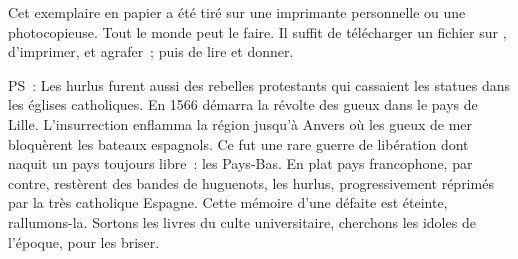 \documentclass[french,twoside]{book} %
\newif\ifdev
\renewcommand{\LettrineFontHook}{\color{rubric}}
\newcommand{\initialiv}[2]{%
  \let\oldLFH\LettrineFontHook
  \IfSubStr{QJ’}{#1}{
    \lettrine[lines=4, lhang=0.2, loversize=-0.1, lraise=0.2]{\smash{#1}}{#2}
  }{\IfSubStr{É}{#1}{
    \lettrine[lines=4, lhang=0.2, loversize=-0, lraise=0]{\smash{#1}}{#2}
  }{\IfSubStr{ÀÂ}{#1}{
    \lettrine[lines=4, lhang=0.2, loversize=-0, lraise=0, slope=0.6em]{\smash{#1}}{#2}
  }{\IfSubStr{A}{#1}{
    \lettrine[lines=4, lhang=0.2, loversize=0.2, slope=0.6em]{\smash{#1}}{#2}
  }{\IfSubStr{V}{#1}{
    \lettrine[lines=4, lhang=0.2, loversize=0.2, slope=-0.5em]{\smash{#1}}{#2}
  }{
    \lettrine[lines=4, lhang=0.2, loversize=0.2]{\smash{#1}}{#2}
  }}}}}
  \let\LettrineFontHook\oldLFH
}
\renewcommand{\LettrineFontHook}{\bfseries\color{rubric}}
\begin{document}
  Cet exemplaire en papier a été tiré sur une imprimante personnelle
   ou une photocopieuse. Tout le monde peut le faire.
  Il suffit de
  télécharger un fichier sur \href{https://hurlus.fr}{},
  d’imprimer, et agrafer ; puis de lire et donner.\par

  \bigskip

  \noindent PS : Les hurlus furent aussi des rebelles protestants qui cassaient les statues dans les églises catholiques. En 1566 démarra la révolte des gueux dans le pays de Lille. L’insurrection enflamma la région jusqu’à Anvers où les gueux de mer bloquèrent les bateaux espagnols.
  Ce fut une rare guerre de libération dont naquit un pays toujours libre : les Pays-Bas.
  En plat pays francophone, par contre, restèrent des bandes de huguenots, les hurlus, progressivement réprimés par la très catholique Espagne.
  Cette mémoire d’une défaite est éteinte, rallumons-la. Sortons les livres du culte universitaire, cherchons les idoles de l’époque, pour les briser.
\fi

\ifdev %
\fontname\font — \textsc{Les règles du jeu}\par
(\hyperref[utopie]{\underline{Lien}})\par
\noindent \initialiv{A}{lors là}\blindtext\par
\noindent \initialiv{À}{ la bonheur des dames}\blindtext\par
\noindent \initialiv{É}{tonnez-le}\blindtext\par
\noindent \initialiv{Q}{ualitativement}\blindtext\par
\noindent \initialiv{V}{aloriser}\blindtext\par
\Blindtext
\phantomsection
\label{utopie}
\Blinddocument
\fi
\end{document}
